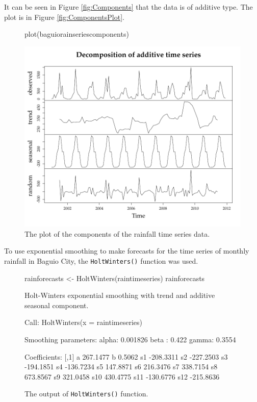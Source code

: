 It can be seen in Figure \eqref{fig:Components} that the data is of additive type. The plot is in Figure \eqref{fig:ComponentsPlot}. 

\begin{figure}[!ht]
\centering
\begin{Schunk}
\begin{Sinput}
plot(baguiorainseriescomponents)
\end{Sinput}

\includegraphics[width=.7\textwidth]{figure/listings-ComponentsPlot} \end{Schunk}


\caption{\label{fig:ComponentsPlot} The plot of the components of the rainfall time series data.}
\end{figure}

To use exponential smoothing to make forecasts for the time series of monthly rainfall in Baguio City, the \texttt{HoltWinters()} function was used.

\begin{figure}[!ht]
\begin{Sinput}
rainforecasts <- HoltWinters(raintimeseries)
rainforecasts
\end{Sinput}
\begin{Soutput}
Holt-Winters exponential smoothing with trend and additive seasonal component.

Call:
 HoltWinters(x = raintimeseries) 

Smoothing parameters:
 alpha:  0.001826 
 beta :  0.422 
 gamma:  0.3554 

Coefficients:
         [,1]
a    267.1477
b      0.5062
s1  -208.3311
s2  -227.2503
s3  -194.1851
s4  -136.7234
s5   147.8871
s6   216.3476
s7   338.7154
s8   673.8567
s9   321.0458
s10  430.4775
s11 -130.6776
s12 -215.8636
\end{Soutput}
\caption{\label{fig:HoltWSmoothing} The output of \texttt{HoltWinters()} function.}
\end{figure}


